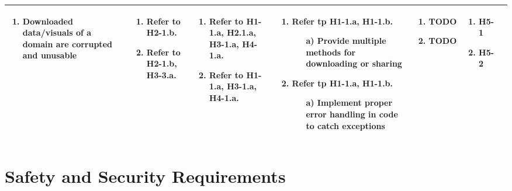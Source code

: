 \documentclass{article}
\begin{document}
\begin{landscape}
\begin{longtable}{|p{3cm}|p{3cm}|p{4cm}|p{4cm}|p{3cm}|p{2cm}|p{3cm}|}
\begin{enumerate}[leftmargin=*]
    \item Downloaded data/visuals of a domain are corrupted and unusable
  \end{enumerate} & 
  \begin{enumerate}[leftmargin=*]
      \item Refer to H2-1.b.
      \item Refer to H2-1.b, H3-3.a.
  \end{enumerate} &
  \begin{enumerate}[leftmargin=*]
    \item Refer to H1-1.a, H2.1.a, H3-1.a, H4-1.a.
    \item Refer to H1-1.a, H3-1.a, H4-1.a.
  \end{enumerate} &
  \begin{enumerate}[leftmargin=*]
       \item Refer tp H1-1.a, H1-1.b.
       \begin{enumerate}
        \item[a)] Provide multiple methods for downloading or sharing
    \end{enumerate}
       \item Refer tp H1-1.a, H1-1.b.
       \begin{enumerate}
        \item[a)] Implement proper error handling in code to catch exceptions
    \end{enumerate}
  \end{enumerate} &
  \begin{enumerate}[leftmargin=*]
       \item TODO
       \item TODO
  \end{enumerate} &
  \begin{enumerate}[leftmargin=*]
       \item H5-1
       \item H5-2
  \end{enumerate} \\
  \hline
  \end{longtable}
\end{landscape}
\restoregeometry


\section{Safety and Security Requirements}

\end{document}
